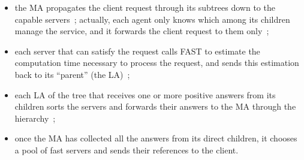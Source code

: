\begin{itemize}
\item the MA propagates the client request through its subtrees down to the
  capable servers~; actually, each agent only knows which among its children manage
  the service, and it forwards the client request to them only~;
\item each server that can satisfy the request calls FAST to estimate the
  computation time necessary to process the request, and sends this
  estimation back to its ``parent'' (the LA)~;
\item each LA of the tree that receives one or more positive answers from its
  children sorts the servers and forwards their answers to the MA through the
  hierarchy~;
\item once the MA has collected all the answers from its direct children, it
  chooses a pool of fast servers and sends their references to the client.
\end{itemize}


